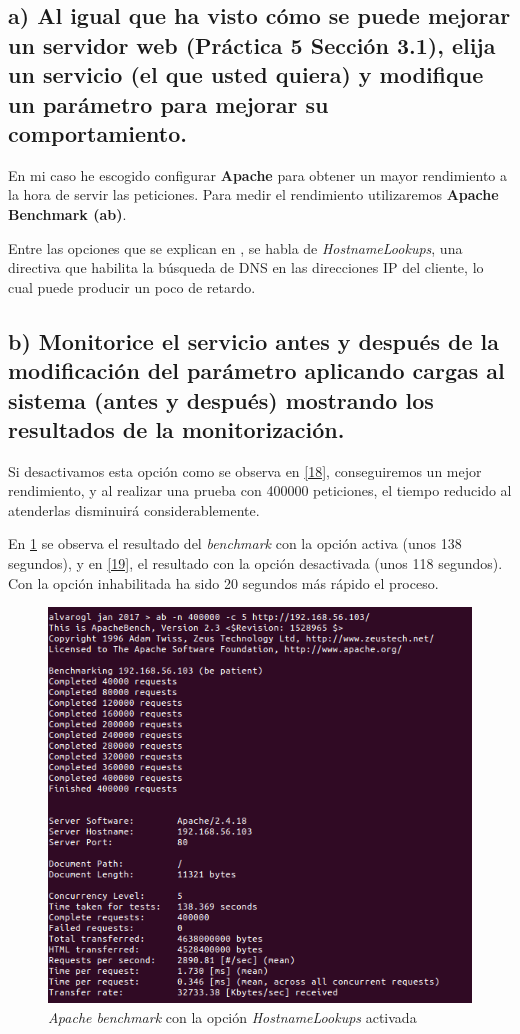 \subsection{a) Al igual que ha visto cómo se puede mejorar un servidor web (Práctica 5 Sección 3.1), elija un servicio (el que usted quiera) y modifique un parámetro para mejorar su comportamiento.}

En mi caso he escogido configurar \textbf{Apache} para obtener un mayor rendimiento a la hora de servir las peticiones. Para medir el rendimiento utilizaremos \textbf{Apache Benchmark (ab)}.

Entre las opciones que se explican en \cite{apache-doc}, se habla de \textit{HostnameLookups}, una directiva que habilita la búsqueda de DNS en las direcciones IP del cliente, lo cual puede producir un poco de retardo.

\subsection{b) Monitorice el servicio antes y después de la modificación del parámetro aplicando cargas al sistema (antes y después) mostrando los resultados de la monitorización.}

Si desactivamos esta opción como se observa en \ref{18}, conseguiremos un mejor rendimiento, y al realizar una prueba con 400000 peticiones, el tiempo reducido al atenderlas disminuirá considerablemente.

En \ref{17} se observa el resultado del \textit{benchmark} con la opción activa (unos 138 segundos), y en \ref{19}, el resultado con la opción desactivada (unos 118 segundos). Con la opción inhabilitada ha sido 20 segundos más rápido el proceso.

\begin{figure}[H]
	\centering
	\includegraphics[scale=0.6]{17.png}
	\caption{\textit{Apache benchmark} con la opción \textit{HostnameLookups} activada} \label{17}
\end{figure}

